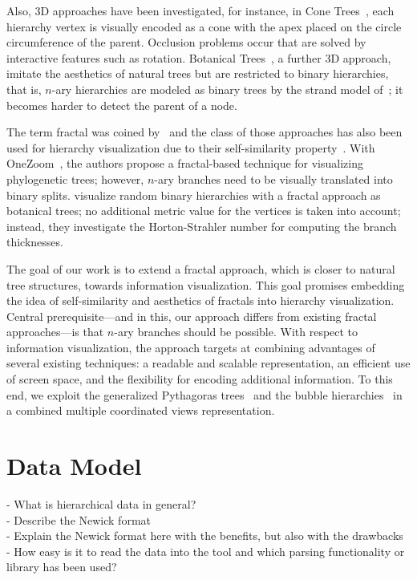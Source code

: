 \documentclass[journal]{vgtc}                %
\begin{document}
Also, 3D approaches have been investigated, for instance, in Cone Trees~\cite{Carriere:95}, each hierarchy vertex is visually encoded as a cone with the apex placed on the circle circumference of the parent. Occlusion problems occur that are solved by interactive features such as rotation. Botanical Trees~\cite{Kleiberg:01}, a further 3D approach, imitate the aesthetics of natural trees but are restricted to binary hierarchies, that is, $n$-ary hierarchies are modeled as binary trees by the strand model of~\cite{Holton:94}; it becomes harder to detect the parent of a node. 

The term fractal was coined by~\cite{Mandelbrot:82} and the class of those approaches has also been used for hierarchy visualization due to their self-similarity property~\cite{Koike:95,Koike:93}. With OneZoom~\cite{Rosindell:12}, the authors propose a fractal-based technique for visualizing phylogenetic trees; however, $n$-ary branches need to be visually translated into binary splits. \cite{Devroye:95} visualize random binary hierarchies with a fractal approach as botanical trees; no additional metric value for the vertices is taken into account; instead, they investigate the Horton-Strahler number for computing the branch thicknesses.

The goal of our work is to extend a fractal approach, which is closer to natural tree structures, towards information visualization. This goal promises embedding the idea of self-similarity and aesthetics of fractals into hierarchy visualization. Central prerequisite---and in this, our approach differs from existing fractal approaches---is that $n$-ary branches should be possible. With respect to information visualization, the approach targets at combining advantages of several existing techniques: a readable and scalable representation, an efficient use of screen space, and the flexibility for encoding additional information. To this end, we exploit the generalized Pythagoras trees~\cite{Beck:14,Beck_IVAPP:14} and the bubble hierarchies~\cite{Hlawatsch:14} in a combined multiple coordinated views representation.



\section{Data Model}

- What is hierarchical data in general?\\
- Describe the Newick format\\
- Explain the Newick format here with the benefits, but also with the drawbacks\\
- How easy is it to read the data into the tool and which parsing functionality or library has been used?
\end{document}
